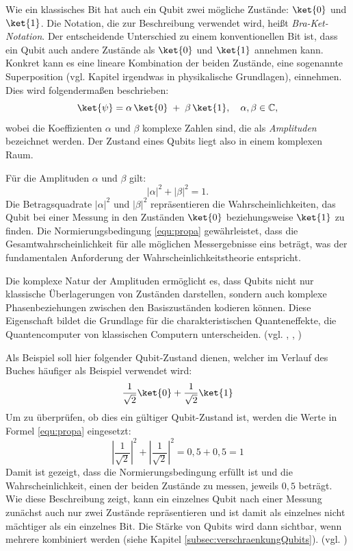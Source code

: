 Wie ein klassisches Bit hat auch ein Qubit zwei mögliche Zustände: $\ket{0}$ und $\ket{1}$. Die Notation, die zur Beschreibung verwendet wird, heißt \emph{Bra-Ket-Notation}. Der entscheidende Unterschied zu einem konventionellen Bit ist, dass ein Qubit auch andere Zustände als $\ket{0}$ und $\ket{1}$ annehmen kann. Konkret kann es eine lineare Kombination der beiden Zustände, eine sogenannte Superposition (vgl. Kapitel irgendwas in physikalische Grundlagen), einnehmen. Dies wird folgendermaßen beschrieben:
\begin{equation}
    \ket{\psi} = \alpha\,\ket{0} \;+\; \beta\,\ket{1}, \quad \alpha, \beta \in \mathbb{C},
\end{equation}
wobei die Koeffizienten \(\alpha\) und \(\beta\) komplexe Zahlen sind, die als \emph{Amplituden} bezeichnet werden. Der Zustand eines Qubits liegt also in einem komplexen Raum.

Für die Amplituden \(\alpha\) und \(\beta\) gilt:
\begin{equation}
\label{equ:propa}
|\alpha|^2 + |\beta|^2 = 1.
\end{equation}
Die Betragsquadrate \(|\alpha|^2\) und \(|\beta|^2\) repräsentieren die Wahrscheinlichkeiten, das Qubit bei einer Messung in den Zuständen \(\ket{0}\) beziehungsweise \(\ket{1}\) zu finden. Die Normierungsbedingung \ref{equ:propa} gewährleistet, dass die Gesamtwahrscheinlichkeit für alle möglichen Messergebnisse eins beträgt, was der fundamentalen Anforderung der Wahrscheinlichkeitstheorie entspricht.

Die komplexe Natur der Amplituden ermöglicht es, dass Qubits nicht nur klassische Überlagerungen von Zuständen darstellen, sondern auch komplexe Phasenbeziehungen zwischen den Basiszuständen kodieren können. Diese Eigenschaft bildet die Grundlage für die charakteristischen Quanteneffekte, die Quantencomputer von klassischen Computern unterscheiden. (vgl. \cite[13 ff.]{nielsen_quantum_2010}, \cite[13 ff.]{rieffel_quantum_2011}, \cite{matuschak_quantum_2019})

Als Beispiel soll hier folgender Qubit-Zustand dienen, welcher im Verlauf des Buches häufiger als Beispiel verwendet wird:
\begin{equation}
\label{equ:basicZustand}
    \frac{1}{\sqrt{2}}\ket{0} + \frac{1}{\sqrt{2}}\ket{1}
\end{equation}
Um zu überprüfen, ob dies ein gültiger Qubit-Zustand ist, werden die Werte in Formel \ref{equ:propa} eingesetzt:
\begin{equation}
    \left|\frac{1}{\sqrt{2}}\right|^2 + \left|\frac{1}{\sqrt{2}}\right|^2 = 0{,}5 + 0{,}5 = 1
\end{equation}
Damit ist gezeigt, dass die Normierungsbedingung erfüllt ist und die Wahrscheinlichkeit, einen der beiden Zustände zu messen, jeweils $0{,}5$ beträgt.
Wie diese Beschreibung zeigt, kann ein einzelnes Qubit nach einer Messung zunächst auch nur zwei Zustände repräsentieren und ist damit als einzelnes nicht mächtiger als ein einzelnes Bit. Die Stärke von Qubits wird dann sichtbar, wenn mehrere kombiniert werden (siehe Kapitel \ref{subsec:verschraenkungQubits}). (vgl. \cite[14]{nielsen_quantum_2010})


